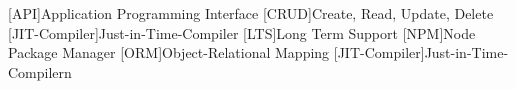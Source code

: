 [API]{Application Programming Interface}
[CRUD]{Create, Read, Update, Delete}
[JIT-Compiler]{Just-in-Time-Compiler}
[LTS]{Long Term Support}
[NPM]{Node Package Manager}
[ORM]{Object-Relational Mapping}
[JIT-Compiler]{Just-in-Time-Compilern}
